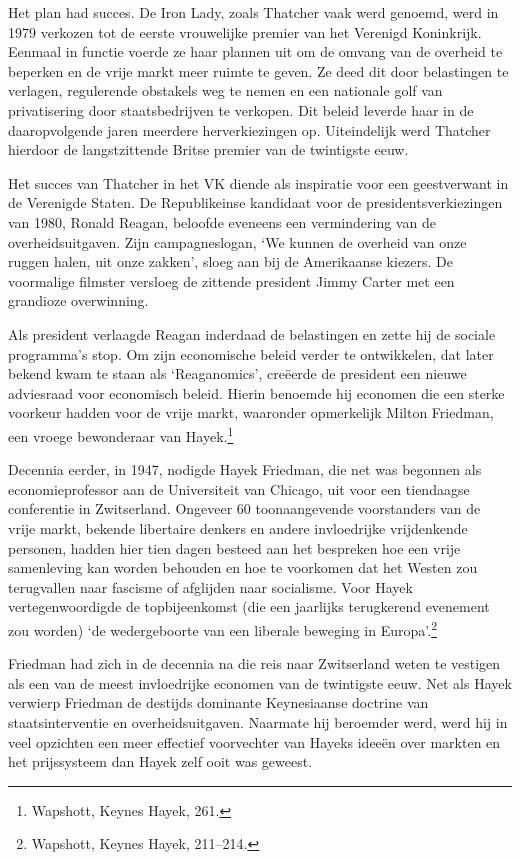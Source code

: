 \documentclass[
  a5paper,
  smalldemyvopaper,11pt,twoside,onecolumn,openright,extrafontsizes]{memoir}
\begin{document}
Het plan had succes. De Iron Lady, zoals Thatcher vaak werd genoemd,
werd in 1979 verkozen tot de eerste vrouwelijke premier van het Verenigd
Koninkrijk. Eenmaal in functie voerde ze haar plannen uit om de omvang
van de overheid te beperken en de vrije markt meer ruimte te geven. Ze
deed dit door belastingen te verlagen, regulerende obstakels weg te
nemen en een nationale golf van privatisering door staatsbedrijven te
verkopen. Dit beleid leverde haar in de daaropvolgende jaren meerdere
herverkiezingen op. Uiteindelijk werd Thatcher hierdoor de
langstzittende Britse premier van de twintigste eeuw.

Het succes van Thatcher in het VK diende als inspiratie voor een
geestverwant in de Verenigde Staten. De Republikeinse kandidaat voor de
presidentsverkiezingen van 1980, Ronald Reagan, beloofde eveneens een
vermindering van de overheidsuitgaven. Zijn campagneslogan, `We kunnen
de overheid van onze ruggen halen, uit onze zakken', sloeg aan bij de
Amerikaanse kiezers. De voormalige filmster versloeg de zittende
president Jimmy Carter met een grandioze overwinning.

Als president verlaagde Reagan inderdaad de belastingen en zette hij de
sociale programma's stop. Om zijn economische beleid verder te
ontwikkelen, dat later bekend kwam te staan als `Reaganomics', creëerde
de president een nieuwe adviesraad voor economisch beleid. Hierin
benoemde hij economen die een sterke voorkeur hadden voor de vrije
markt, waaronder opmerkelijk Milton Friedman, een vroege bewonderaar van
Hayek.\footnote{Wapshott, Keynes Hayek, 261.}

Decennia eerder, in 1947, nodigde Hayek Friedman, die net was begonnen
als economieprofessor aan de Universiteit van Chicago, uit voor een
tiendaagse conferentie in Zwitserland. Ongeveer 60 toonaangevende
voorstanders van de vrije markt, bekende libertaire denkers en andere
invloedrijke vrijdenkende personen, hadden hier tien dagen besteed aan
het bespreken hoe een vrije samenleving kan worden behouden en hoe te
voorkomen dat het Westen zou terugvallen naar fascisme of afglijden naar
socialisme. Voor Hayek vertegenwoordigde de topbijeenkomst (die een
jaarlijks terugkerend evenement zou worden) `de wedergeboorte van een
liberale beweging in Europa'.\footnote{Wapshott, Keynes Hayek, 211--214.}

Friedman had zich in de decennia na die reis naar Zwitserland weten te
vestigen als een van de meest invloedrijke economen van de twintigste
eeuw. Net als Hayek verwierp Friedman de destijds dominante Keynesiaanse
doctrine van staatsinterventie en overheidsuitgaven. Naarmate hij
beroemder werd, werd hij in veel opzichten een meer effectief
voorvechter van Hayeks ideeën over markten en het prijssysteem dan Hayek
zelf ooit was geweest.
\end{document}
